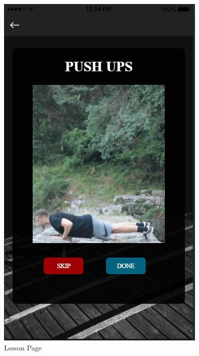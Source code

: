 \documentclass[a4paper,12pt]{article}
\begin{document}
			\begin{figure}[!htb]
				\caption{Lesson Page}
				\vspace*{0.5cm}

				  \includegraphics[width=\linewidth]{lesson2}
				  

\end{figure}
\end{document}
